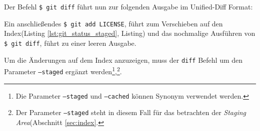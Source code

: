 

Der Befehl \texttt{\$ git diff} führt nun zur folgenden Ausgabe im Unified-Diff
Format:



Ein anschließendes \texttt{\$ git add LICENSE}, führt zum Verschieben auf den
Index(Listing \ref{lst:git_status_staged}, Listing) und das nochmalige
Ausführen von \texttt{\$ git diff}, führt zu einer leeren Ausgabe.



Um die Änderungen auf dem Index anzuzeigen, muss der \texttt{diff} Befehl um
den Parameter \texttt{--staged} ergänzt werden\footnote{Die Parameter
\texttt{--staged} und \texttt{--cached} können Synonym verwendet
werden.},\footnote{Der Parameter \texttt{--staged} steht in diesem Fall für das
betrachten der \textit{Staging Area}(Abschnitt
\ref{sec:index}.}.\cite[26-29]{progit}
